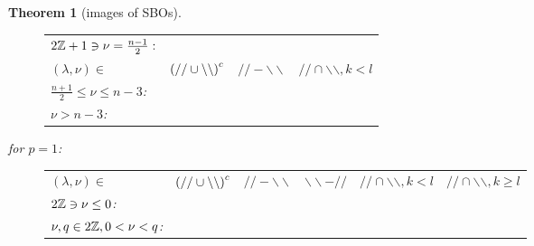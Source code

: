 \documentclass[10pt]{article} %
\newtheorem{theorem}{Theorem}
\theoremstyle{definition}
\newcommand{\even}{2\Z}
\newcommand{\odd}{2\Z+1}
\newcommand{\bb}{\backslash\backslash}
\renewcommand{\ss}{//}
\begin{document}
\begin{theorem}[images of SBOs]
\begin{enumerate}
\begin{figure}[H]
\begin{tabular}{m{3cm}ccc}
	      \vspace{-3cm}$\odd\ni\nu=\frac{n-1}{2}:$&\\[25pt]
	      $(\lambda,\nu)\in$&$\left(//\cup\backslash\backslash\right)^c$ & $//-\backslash\backslash$  & $//\cap\backslash\backslash,k< l$\\[15pt]
	      \vspace{-3cm}$\frac{n+1}{2}\le\nu\le n-3$:&\\[25pt]
	      \vspace{-3cm}$\nu>n-3$:&\\[15pt]
	    \end{tabular}
	  \end{figure}
	\end{enumerate}
	for $p=1$:\\
	\begin{figure}[H]
		\centering\begin{tabular}{p{4.5cm}cccp{2.5cm}p{2.5cm}}
		$(\lambda,\nu)\in$ & $\mybra{\ss\cup\bb}^c$ & $\ss-\bb$ & $\bb-\ss$ & $\ss\cap\bb,k<l$ & $\ss\cap\bb,k\geq l$\\
		\vspace{-0.7cm}$\even\ni\nu\le0$:&\\
		\vspace{-0.5cm}$\nu,q\in2\mathbb{Z},0<\nu<q$:&\\

\end{tabular}
\end{figure}
\end{theorem}
\end{document}
